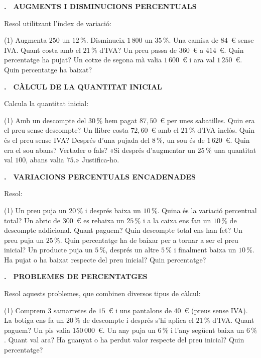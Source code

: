 \documentclass[11pt,a4paper]{article}
\newcounter{exer}
\newcommand{\ex}[2]{\par\needspace{5\baselineskip}\bigskip\stepcounter{exer}\noindent
  {\color{cursfosc}\bfseries\theexer.}\ \ {\scriptsize\bfseries\color{curs}\MakeUppercase{#1}}\par\nopagebreak\smallskip
  \noindent #2\par}
\begin{document}
\ex{Augments i disminucions percentuals}{Resol utilitzant l'índex de variació:}
\begin{tasks}(1)
  \task Augmenta $250$ un $12\,\%$.
  \task Disminueix $1\,800$ un $35\,\%$.
  \task Una camisa de $84$~€ sense IVA. Quant costa amb el $21\,\%$ d'IVA?
  \task Un preu passa de $360$~€ a $414$~€. Quin percentatge ha pujat?
  \task Un cotxe de segona mà valia $1\,600$~€ i ara val $1\,250$~€. Quin percentatge ha baixat?
\end{tasks}

\ex{Càlcul de la quantitat inicial}{Calcula la quantitat inicial:}
\begin{tasks}(1)
  \task Amb un descompte del $30\,\%$ hem pagat $87,50$~€ per unes sabatilles. Quin era el preu sense descompte?
  \task Un llibre costa $72,60$~€ amb el $21\,\%$ d'IVA inclòs. Quin és el preu sense IVA?
  \task Després d'una pujada del $8\,\%$, un sou és de $1\,620$~€. Quin era el sou abans?
  \task Vertader o fals? «Si després d'augmentar un $25\,\%$ una quantitat val $100$, abans valia $75$.» Justifica-ho.
\end{tasks}

\ex{Variacions percentuals encadenades}{Resol:}
\begin{tasks}(1)
  \task Un preu puja un $20\,\%$ i després baixa un $10\,\%$. Quina és la variació percentual total?
  \task Un abric de $300$~€ es rebaixa un $25\,\%$ i a la caixa ens fan un $10\,\%$ de descompte addicional. Quant paguem? Quin descompte total ens han fet?
  \task Un preu puja un $25\,\%$. Quin percentatge ha de baixar per a tornar a ser el preu inicial?
  \task Un producte puja un $5\,\%$, després un altre $5\,\%$ i finalment baixa un $10\,\%$. Ha pujat o ha baixat respecte del preu inicial? Quin percentatge?
\end{tasks}

\ex{Problemes de percentatges}{Resol aquests problemes, que combinen diversos tipus de càlcul:}
\begin{tasks}(1)
  \task Comprem $3$ samarretes de $15$~€ i uns pantalons de $40$~€ (preus sense IVA). La botiga ens fa un $20\,\%$ de descompte i després s'hi aplica el $21\,\%$ d'IVA. Quant paguem?
  \task Un pis valia $150\,000$~€. Un any puja un $6\,\%$ i l'any següent baixa un $6\,\%$. Quant val ara? Ha guanyat o ha perdut valor respecte del preu inicial? Quin percentatge?
\end{tasks}
\end{document}
